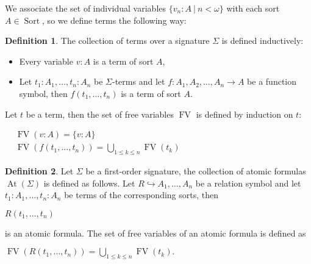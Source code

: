 \documentclass[8pt]{article}
\theoremstyle{definition}
\newtheorem{definition}{Definition}[section]
\theoremstyle{definition}
\theoremstyle{definition}
\theoremstyle{definition}
\theoremstyle{definition}
\theoremstyle{definition}
\theoremstyle{definition}
\theoremstyle{definition}
\theoremstyle{definition}
\theoremstyle{definition}
\theoremstyle{definition}
\theoremstyle{definition}
\theoremstyle{definition}
\theoremstyle{question}
\begin{document}
We associate the set of individual variables $\{ v_n : A \: | \: n < \omega\}$ 
with each sort $A \in \operatorname{Sort}$, so we define terms the following way:
\begin{definition}
  The collection of terms over a signature $\Sigma$ is defined inductively:
  \begin{itemize}
    \item Every variable $v : A$ is a term of sort $A$,
    \item Let $t_1 : A_1, \ldots, t_n : A_n$ be $\Sigma$-terms and let
    $f : A_1, A_2, \ldots, A_n \to A$ be a function symbol, then 
    $f(t_1, \ldots, t_n)$ is a term of sort $A$.
  \end{itemize}
\end{definition}

Let $t$ be a term, then the set of free variables $\operatorname{FV}$ is defined by induction on $t$:

\begin{center}
$\begin{array}{lll}
  & \operatorname{FV}(v : A) = \{ v : A \} & \\
  & \operatorname{FV}(f(t_1, \ldots, t_n)) = \bigcup \limits_{1 \leq k \leq n} \operatorname{FV}(t_k)&
\end{array}$
\end{center}

\begin{definition}
  Let $\Sigma$ be a first-order signature,
  the collection of atomic formulas $\operatorname{At}(\Sigma)$ is defined as follows.
  Let $R \hookrightarrow A_1, \ldots, A_n$ be a relation symbol
  and let $t_1 : A_1, \ldots, t_n : A_n$ be terms of the corresponding sorts, then
  \begin{center}
    $R(t_1, \ldots, t_n)$
  \end{center}
  is an atomic formula. The set of free variables of an atomic formula is defined as
  \begin{center}
    $\operatorname{FV}(R(t_1, \ldots, t_n)) = \bigcup \limits_{1 \leq k \leq n} \operatorname{FV}(t_k).$
  \end{center}
\end{definition}
\end{document}

